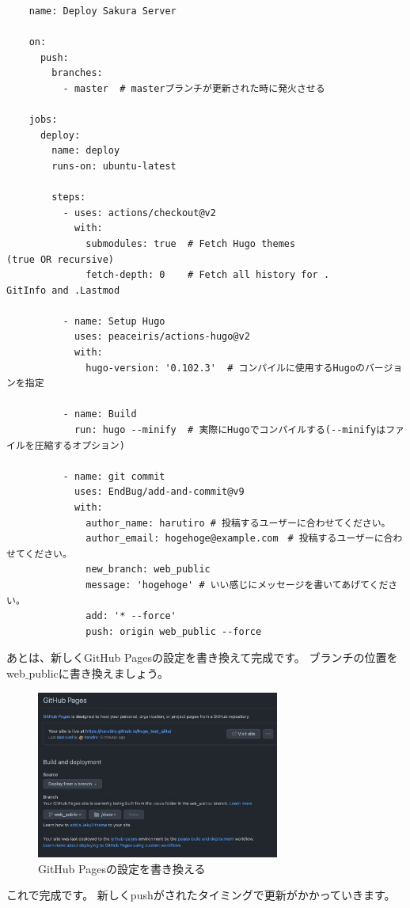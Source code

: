 \begin{tcolorbox}[breakable]
  \begin{verbatim}
    name: Deploy Sakura Server

    on:
      push:
        branches:
          - master  # masterブランチが更新された時に発火させる
    
    jobs:
      deploy:
        name: deploy
        runs-on: ubuntu-latest
        
        steps:
          - uses: actions/checkout@v2
            with:
              submodules: true  # Fetch Hugo themes 
(true OR recursive)
              fetch-depth: 0    # Fetch all history for .
GitInfo and .Lastmod
    
          - name: Setup Hugo
            uses: peaceiris/actions-hugo@v2
            with:
              hugo-version: '0.102.3'  # コンパイルに使用するHugoのバージョンを指定
    
          - name: Build
            run: hugo --minify  # 実際にHugoでコンパイルする(--minifyはファイルを圧縮するオプション)
    
          - name: git commit
            uses: EndBug/add-and-commit@v9
            with:
              author_name: harutiro # 投稿するユーザーに合わせてください。
              author_email: hogehoge@example.com　# 投稿するユーザーに合わせてください。
              new_branch: web_public
              message: 'hogehoge' # いい感じにメッセージを書いてあげてください。
              add: '* --force' 
              push: origin web_public --force
  \end{verbatim}
\end{tcolorbox}

あとは、新しくGitHub Pagesの設定を書き換えて完成です。
ブランチの位置をweb$\_$publicに書き換えましょう。

\begin{figure}[H]
  \centering
  \includegraphics[width=8cm]{./image/02-chap8/web_public.png}
  \caption{GitHub Pagesの設定を書き換える}
  \label{chap8-web_public-image}
\end{figure}

これで完成です。
新しくpushがされたタイミングで更新がかかっていきます。